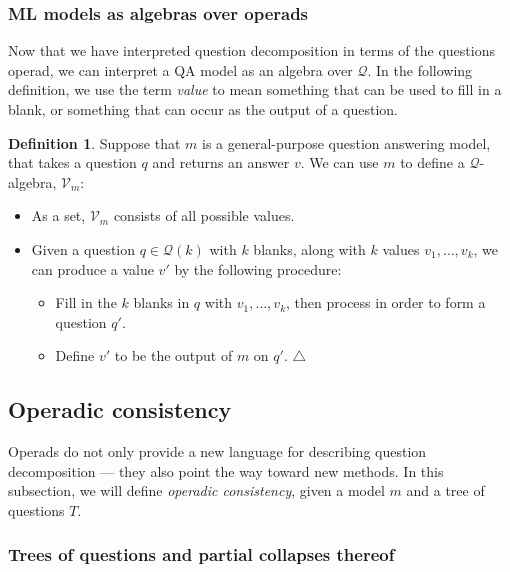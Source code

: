 \documentclass{article}
\theoremstyle{plain}
\theoremstyle{definition}
\newtheorem{definition}[theorem]{Definition}
\theoremstyle{remark}
\theoremstyle{definition}
\newcommand\cQ{\mathcal{Q}}
\newcommand\cV{\mathcal{V}}
\begin{document}
\subsubsection{ML models as algebras over operads}

Now that we have interpreted question decomposition in terms of the questions operad, we can interpret a QA model as an algebra over $\cQ$.
In the following definition, we use the term \emph{value} to mean something that can be used to fill in a blank, or something that can occur as the output of a question.

\begin{definition}
\label{def:V_m}
Suppose that $m$ is a general-purpose question answering model, that takes a question $q$ and returns an answer $v$.
We can use $m$ to define a $\cQ$-algebra, $\cV_m$:
\begin{itemize}
\item As a set, $\cV_m$ consists of all possible values.

\item Given a question $q \in \cQ(k)$ with $k$ blanks, along with $k$ values $v_1,\ldots,v_k$, we can produce a value $v'$ by the following procedure:
\begin{itemize}
\item Fill in the $k$ blanks in $q$ with $v_1,\ldots,v_k$, then process in order to form a question $q'$.

\item Define $v'$ to be the output of $m$ on $q'$.
\null\hfill$\triangle$
\end{itemize}
\end{itemize}
\end{definition}

\subsection{Operadic consistency}

Operads do not only provide a new language for describing question decomposition --- they also point the way toward new methods.
In this subsection, we will define \emph{operadic consistency}, given a model $m$ and a tree of questions $T$.

\subsubsection{Trees of questions and partial collapses thereof}
\end{document}
